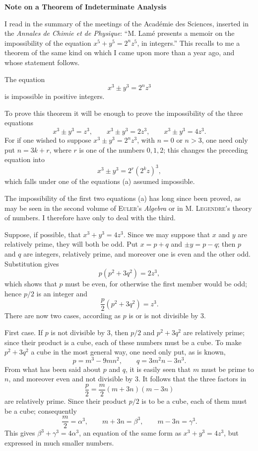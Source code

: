 \documentclass[11pt]{article}
\newcommand{\scn}[1]{\textsc{#1}}
\begin{document}
\begin{center}
{\Large\bfseries Note on a Theorem of Indeterminate Analysis\par}
\vspace{0.8em}
\end{center}

I read in the summary of the meetings of the Académie des Sciences, inserted in the \emph{Annales de Chimie et de Physique}: ``M. Lamé presents a memoir on the impossibility of the equation $x^5+y^5=2^n z^5$, in integers.'' This recalls to me a theorem of the same kind on which I came upon more than a year ago, and whose statement follows.

The equation
\[
 x^3\pm y^3=2^n z^3
\]
is impossible in positive integers.

To prove this theorem it will be enough to prove the impossibility of the three equations
\[
\tag{a}
 x^3\pm y^3=z^3,\qquad x^3\pm y^3=2z^3,\qquad x^3\pm y^3=4z^3.
\]
For if one wished to suppose $x^3\pm y^3=2^n z^3$, with $n=0$ or $n>3$, one need only put $n=3k+r$, where $r$ is one of the numbers $0,1,2$; this changes the preceding equation into
\[
 x^3\pm y^3=2^r(2^kz)^3,
\]
which falls under one of the equations (a) assumed impossible.

The impossibility of the first two equations (a) has long since been proved, as may be seen in the second volume of \scn{Euler}'s \emph{Algebra} or in M. \scn{Legendre}'s theory of numbers. I therefore have only to deal with the third.

Suppose, if possible, that $x^3+y^3=4z^3$. Since we may suppose that $x$ and $y$ are relatively prime, they will both be odd. Put $x=p+q$ and $\pm y=p-q$; then $p$ and $q$ are integers, relatively prime, and moreover one is even and the other odd. Substitution gives
\[
 p(p^2+3q^2)=2z^3,
\]
which shows that $p$ must be even, for otherwise the first member would be odd; hence $p/2$ is an integer and
\[
 \frac p2(p^2+3q^2)=z^3.
\]
There are now two cases, according as $p$ is or is not divisible by $3$.

First case. If $p$ is not divisible by $3$, then $p/2$ and $p^2+3q^2$ are relatively prime; since their product is a cube, each of these numbers must be a cube. To make $p^2+3q^2$ a cube in the most general way, one need only put, as is known,
\[
 p=m^3-9mn^2,\qquad q=3m^2n-3n^3.
\]
From what has been said about $p$ and $q$, it is easily seen that $m$ must be prime to $n$, and moreover even and not divisible by $3$. It follows that the three factors in
\[
 \frac p2=\frac m2(m+3n)(m-3n)
\]
are relatively prime. Since their product $p/2$ is to be a cube, each of them must be a cube; consequently
\[
 \frac m2=\alpha^3,\qquad m+3n=\beta^3,\qquad m-3n=\gamma^3.
\]
This gives $\beta^3+\gamma^3=4\alpha^3$, an equation of the same form as $x^3+y^3=4z^3$, but expressed in much smaller numbers.
\end{document}
